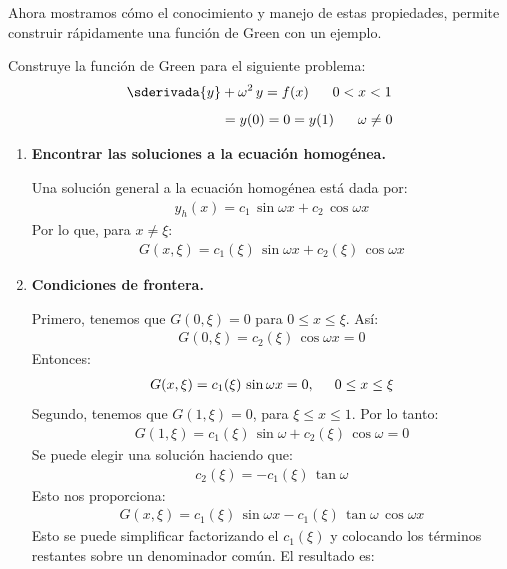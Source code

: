 Ahora mostramos cómo el conocimiento y manejo de estas propiedades, permite construir rápidamente una función de Green con un ejemplo.
\begin{ejemplo}
Construye la función de Green para el siguiente problema:
\begin{align*}
\sderivada{y} &+ \omega^{2} \, y = f(x) \hspace{0.6cm} 0 < x < 1 \\[0.5em]
&=y (0) = 0 = y (1) \hspace{0.6cm} \omega \neq 0
\end{align*}
\begin{enumerate}
\item \textbf{Encontrar las soluciones a la ecuación homogénea.}
\par
\noindent
Una solución general a la ecuación homogénea está dada por:
\begin{align*}
y_{h} (x) = c_{1} \, \sin \omega x + c_{2} \, \cos \omega x
\end{align*}
Por lo que, para $x \neq \xi$:
\begin{align*}
G (x, \xi) = c_{1} (\xi) \, \sin \omega x + c_{2} (\xi) \, \cos \omega x
\end{align*}
\item \textbf{Condiciones de frontera.}
\par
\noindent
Primero, tenemos que $G (0, \xi) = 0$ para $0 \leq x \leq \xi$. Así:
\begin{align*}
G (0, \xi) = c_{2} (\xi) \, \cos \omega x = 0
\end{align*}
Entonces:
\begin{align*}
G (x, \xi) = c_{1} (\xi) \, \sin \omega x = 0, \hspace{0.5cm} 0 \leq x \leq \xi
\end{align*}
Segundo, tenemos que $G (1, \xi) = 0$, para $\xi \leq x \leq 1$. Por lo tanto:
\begin{align*}
G (1, \xi) = c_{1} (\xi) \, \sin \omega + c_{2} (\xi) \, \cos \omega = 0
\end{align*}
Se puede elegir una solución haciendo que:
\begin{align*}
c_{2} (\xi) = - c_{1} (\xi) \, \tan \omega
\end{align*}
Esto nos proporciona:
\begin{align*}
G (x, \xi) = c_{1} (\xi) \, \sin \omega x - c_{1} (\xi) \, \tan \omega \, \cos \omega x
\end{align*}
Esto se puede simplificar factorizando el $c_{1} (\xi)$ y colocando los términos restantes sobre un denominador común. El resultado es:

\end{enumerate}
\end{ejemplo}
